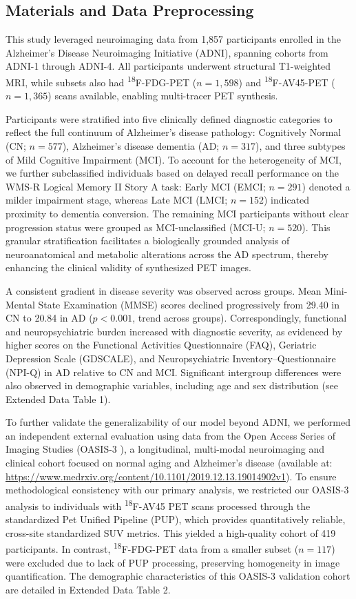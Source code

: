 \documentclass[a4paper]{cas-sc}
\begin{document}
\subsection{Materials and Data Preprocessing}
This study leveraged neuroimaging data from 1,857 participants enrolled in the Alzheimer’s Disease Neuroimaging Initiative (ADNI), spanning cohorts from ADNI-1 through ADNI-4. All participants underwent structural T1-weighted MRI, while subsets also had \textsuperscript{18}F-FDG-PET ($n = 1,598$) and \textsuperscript{18}F-AV45-PET ($n = 1,365$) scans available, enabling multi-tracer PET synthesis.

Participants were stratified into five clinically defined diagnostic categories to reflect the full continuum of Alzheimer’s disease pathology: Cognitively Normal (CN; $n = 577$), Alzheimer’s disease dementia (AD; $n = 317$), and three subtypes of Mild Cognitive Impairment (MCI). To account for the heterogeneity of MCI, we further subclassified individuals based on delayed recall performance on the WMS-R Logical Memory II Story A task: Early MCI (EMCI; $n = 291$) denoted a milder impairment stage, whereas Late MCI (LMCI; $n = 152$) indicated proximity to dementia conversion. The remaining MCI participants without clear progression status were grouped as MCI-unclassified (MCI-U; $n = 520$). This granular stratification facilitates a biologically grounded analysis of neuroanatomical and metabolic alterations across the AD spectrum, thereby enhancing the clinical validity of synthesized PET images.

A consistent gradient in disease severity was observed across groups. Mean Mini-Mental State Examination (MMSE) scores declined progressively from 29.40 in CN to 20.84 in AD ($p < 0.001$, trend across groups). Correspondingly, functional and neuropsychiatric burden increased with diagnostic severity, as evidenced by higher scores on the Functional Activities Questionnaire (FAQ), Geriatric Depression Scale (GDSCALE), and Neuropsychiatric Inventory–Questionnaire (NPI-Q) in AD relative to CN and MCI. Significant intergroup differences were also observed in demographic variables, including age and sex distribution (see Extended Data Table 1).

To further validate the generalizability of our model beyond ADNI, we performed an independent external evaluation using data from the Open Access Series of Imaging Studies (OASIS-3 ), a longitudinal, multi-modal neuroimaging and clinical cohort focused on normal aging and Alzheimer’s disease (available at: \url{https://www.medrxiv.org/content/10.1101/2019.12.13.19014902v1}). To ensure methodological consistency with our primary analysis, we restricted our OASIS-3 analysis to individuals with \textsuperscript{18}F-AV45 PET scans processed through the standardized Pet Unified Pipeline (PUP), which provides quantitatively reliable, cross-site standardized SUV metrics. This yielded a high-quality cohort of 419 participants. In contrast, \textsuperscript{18}F-FDG-PET data from a smaller subset ($n = 117$) were excluded due to lack of PUP processing, preserving homogeneity in image quantification. The demographic characteristics of this OASIS-3 validation cohort are detailed in Extended Data Table 2.
\end{document}
